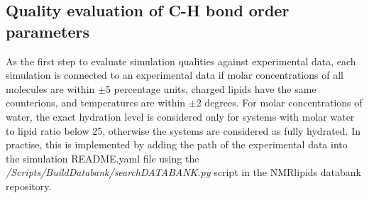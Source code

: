 \documentclass[fleqn,10pt]{wlscirep}
\begin{document}
\subsection{Quality evaluation of C-H bond order parameters}
As the first step to evaluate simulation qualities against experimental data, each simulation is connected to an experimental data if molar concentrations of all molecules are within $\pm$5 percentage units, charged lipids have the same counterions, and temperatures are within $\pm$2 degrees. For molar concentrations of water, the exact hydration level is considered only for systems with molar water to lipid ratio below 25, otherwise the systems are considered as fully hydrated. In practise, this is implemented by adding the path of the experimental data into the simulation README.yaml file using the {\it /Scripts/BuildDatabank/searchDATABANK.py} script in the NMRlipids databank repository. 

%
\end{document}
